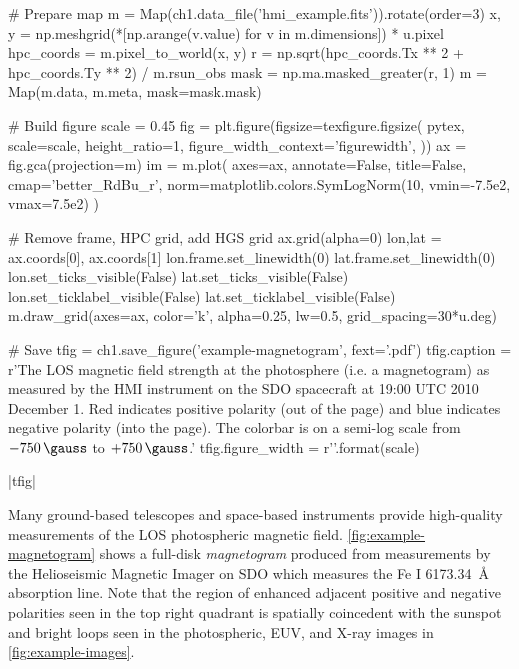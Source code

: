 \begin{pycode}[chapter1]
# Prepare map
m = Map(ch1.data_file('hmi_example.fits')).rotate(order=3)
x, y = np.meshgrid(*[np.arange(v.value) for v in m.dimensions]) * u.pixel
hpc_coords = m.pixel_to_world(x, y)
r = np.sqrt(hpc_coords.Tx ** 2 + hpc_coords.Ty ** 2) / m.rsun_obs
mask = np.ma.masked_greater(r, 1)
m = Map(m.data, m.meta, mask=mask.mask)

# Build figure
scale = 0.45
fig = plt.figure(figsize=texfigure.figsize(
    pytex,
    scale=scale,
    height_ratio=1,
    figure_width_context='figurewidth',
))
ax = fig.gca(projection=m)
im = m.plot(
    axes=ax,
    annotate=False,
    title=False,
    cmap='better_RdBu_r',
    norm=matplotlib.colors.SymLogNorm(10, vmin=-7.5e2, vmax=7.5e2)
)

# Remove frame, HPC grid, add HGS grid
ax.grid(alpha=0)
lon,lat = ax.coords[0], ax.coords[1]
lon.frame.set_linewidth(0)
lat.frame.set_linewidth(0)
lon.set_ticks_visible(False)
lat.set_ticks_visible(False)
lon.set_ticklabel_visible(False)
lat.set_ticklabel_visible(False)
m.draw_grid(axes=ax, color='k', alpha=0.25, lw=0.5, grid_spacing=30*u.deg)

# Save
tfig = ch1.save_figure('example-magnetogram', fext='.pdf')
tfig.caption = r'The LOS magnetic field strength at the photosphere (i.e. a magnetogram) as measured by the HMI instrument on the SDO spacecraft at 19:00 UTC 2010 December 1. Red indicates positive polarity (out of the page) and blue indicates negative polarity (into the page). The colorbar is on a semi-log scale from $-\SI{750}{\gauss}$ to $+\SI{750}{\gauss}$.'
tfig.figure_width = r'{}\textwidth'.format(scale)
\end{pycode}
\py[chapter1]|tfig|

Many ground-based telescopes \citep[e.g. GONG, Mt. Wilson,][]{howard_mount_1976} and space-based instruments \citep[e.g. SOHO/MDI][]{scherrer_solar_1995} provide high-quality measurements of the LOS photospheric magnetic field. \autoref{fig:example-magnetogram} shows a full-disk \textit{magnetogram} produced from measurements by the Helioseismic Magnetic Imager \citep[HMI,][]{hoeksema_helioseismic_2014} on SDO which measures the Fe I \SI{6173.34}{\angstrom} absorption line. Note that the region of enhanced adjacent positive and negative polarities seen in the top right quadrant is spatially coincedent with the sunspot and bright loops seen in the photospheric, EUV, and X-ray images in \autoref{fig:example-images}.

